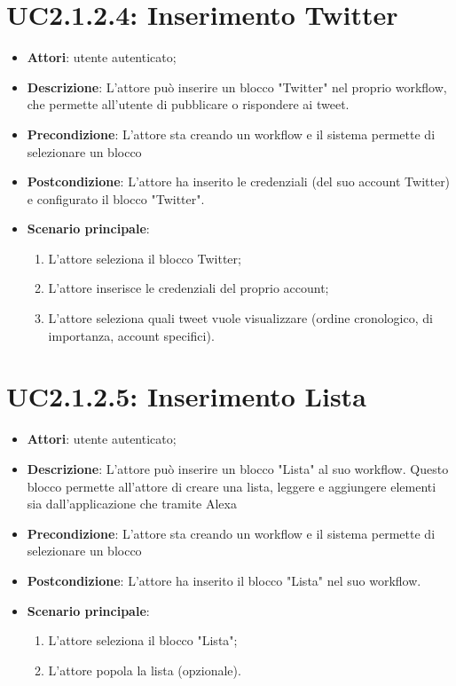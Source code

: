 \section{UC2.1.2.4: Inserimento Twitter}
\label{UC2.1.2.4}
\begin{itemize}
	\item \textbf{Attori}: utente autenticato;
	\item \textbf{Descrizione}: L'attore può inserire un blocco "Twitter" nel proprio workflow, che permette all'utente di pubblicare o rispondere ai tweet.
	\item \textbf{Precondizione}: L'attore sta creando un workflow e il sistema permette di selezionare un blocco
	\item \textbf{Postcondizione}: L'attore ha inserito le credenziali (del suo account Twitter) e configurato il blocco "Twitter".
	\item \textbf{Scenario principale}:
	\begin{enumerate} \item L'attore seleziona il blocco Twitter;  \item  L'attore inserisce le credenziali del proprio account;  \item  L'attore seleziona quali tweet vuole visualizzare (ordine cronologico, di importanza, account specifici).\end{enumerate}
\end{itemize}

\section{UC2.1.2.5: Inserimento Lista}
\label{UC2.1.2.5}
\begin{itemize}
	\item \textbf{Attori}: utente autenticato;
	\item \textbf{Descrizione}: L'attore può inserire un blocco "Lista" al suo workflow. Questo blocco permette all'attore di creare una lista, leggere e aggiungere elementi sia dall'applicazione che tramite Alexa
	\item \textbf{Precondizione}: L'attore sta creando un workflow e il sistema permette di selezionare un blocco
	\item \textbf{Postcondizione}: L'attore ha inserito il blocco "Lista" nel suo workflow.
	\item \textbf{Scenario principale}:
	\begin{enumerate} \item L'attore seleziona il blocco "Lista";  \item  L'attore popola la lista (opzionale).\end{enumerate}
\end{itemize}

